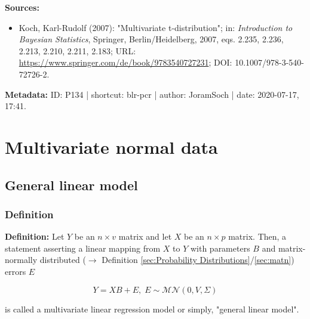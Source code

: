 \documentclass[a4paper,12pt,twoside]{book}
\begin{document}
\vspace{1em}
\textbf{Sources:}
\begin{itemize}
\item Koch, Karl-Rudolf (2007): "Multivariate t-distribution"; in: \textit{Introduction to Bayesian Statistics}, Springer, Berlin/Heidelberg, 2007, eqs. 2.235, 2.236, 2.213, 2.210, 2.211, 2.183; URL: \url{https://www.springer.com/de/book/9783540727231}; DOI: 10.1007/978-3-540-72726-2.
\end{itemize}


\vspace{1em}
\textbf{Metadata:} ID: P134 | shortcut: blr-pcr | author: JoramSoch | date: 2020-07-17, 17:41.
\vspace{1em}



\pagebreak
\section{Multivariate normal data}

\subsection{General linear model}

\subsubsection[\textit{Definition}]{Definition} \label{sec:glm}
\setcounter{equation}{0}

\textbf{Definition:} Let $Y$ be an $n \times v$ matrix and let $X$ be an $n \times p$ matrix. Then, a statement asserting a linear mapping from $X$ to $Y$ with parameters $B$ and matrix-normally distributed ($\rightarrow$ Definition \ref{sec:Probability Distributions}/\ref{sec:matn}) errors $E$

\begin{equation} \label{eq:glm-glm}
Y = X B + E, \; E \sim \mathcal{MN}(0, V, \Sigma)
\end{equation}

is called a multivariate linear regression model or simply, "general linear model".
\end{document}
